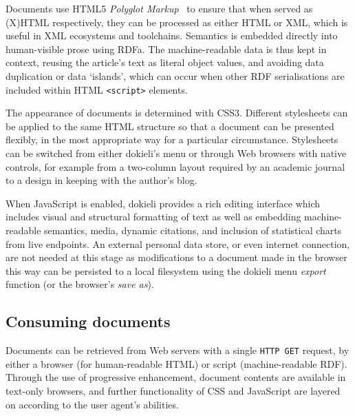 \documentclass[a4paper]{llncs}
\begin{document}
                                
                                    
\par Documents use HTML5 \textit{Polyglot Markup}~\cite{ref-11} to ensure that when served as (X)HTML respectively, they can be processed as either HTML or XML, which is useful in XML ecosystems and toolchains. Semantics is embedded directly into human-visible prose using RDFa. The machine-readable data is thus kept in context, reusing the article’s text as literal object values, and avoiding data duplication or data ‘islands’, which can occur when other RDF serialisations are included within HTML {\tt <script>} elements.
                                    

                                    
\par The appearance of documents is determined with CSS3. Different stylesheets can be applied to the same HTML structure so that a document can be presented flexibly, in the most appropriate way for a particular circumstance. Stylesheets can be switched from either dokieli’s menu or through Web browsers with native controls, for example from a two-column layout required by an academic journal to a design in keeping with the author’s blog.

                                    
\par When JavaScript is enabled, dokieli provides a rich editing interface which includes visual and structural formatting of text as well as embedding machine-readable semantics, media, dynamic citations, and inclusion of statistical charts from live endpoints. An external personal data store, or even internet connection, are not needed at this stage as modifications to a document made in the browser this way can be persisted to a local filesystem using the dokieli menu \textit{export} function (or the browser’s \textit{save as}).
                                
                            

                            
                                \subsection{Consuming documents}
  \label{consuming-documents}

                                
                                    
\par Documents can be retrieved from Web servers with a single {\tt HTTP GET} request, by either a browser (for human-readable HTML) or script (machine-readable RDF). Through the use of progressive enhancement, document contents are available in text-only browsers, and further functionality of CSS and JavaScript are layered on according to the user agent’s abilities.
\end{document}
